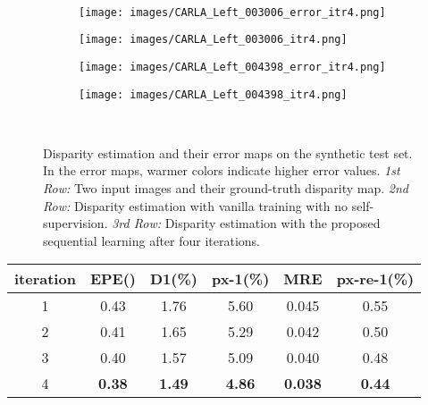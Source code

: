 \documentclass[10pt,twocolumn,letterpaper]{article}
\begin{document}
\begin{figure}[tbp]
	\\\begin{minipage}[c]{0.985\linewidth}
		\begin{subfigure}[c]{.239\linewidth}
			\texttt{[image: images/CARLA\_Left\_003006\_error\_itr4.png]}
			\vspace*{-0.38cm}
		\end{subfigure}	
		\begin{subfigure}[c]{.239\linewidth}
			\texttt{[image: images/CARLA\_Left\_003006\_itr4.png]}
			\vspace*{-0.38cm}		
		\end{subfigure}
		\begin{subfigure}[c]{.239\linewidth}
			\texttt{[image: images/CARLA\_Left\_004398\_error\_itr4.png]}
			\vspace*{-0.38cm}
		\end{subfigure}	
		\begin{subfigure}[c]{.239\linewidth}
			\texttt{[image: images/CARLA\_Left\_004398\_itr4.png]}
			\vspace*{-0.38cm}		
		\end{subfigure}
	\end{minipage}	\\\vspace{-0.3cm}
	\caption{Disparity estimation and their error maps on the synthetic test set. In the error maps, warmer colors indicate higher error values. \emph{1st Row:} Two input images and their ground-truth disparity map. \emph{2nd Row:} Disparity estimation with vanilla training with no self-supervision. \emph{3rd Row:} Disparity estimation with the proposed sequential learning after four iterations.} 
	\label{fig:final}
\end{figure} \begin{table}[tbp]
	\begin{center}
		\footnotesize
		\begin{tabular}{@{\hskip1pt}c@{\hskip1pt}|@{\hskip1pt}c@{\hskip1pt}|@{\hskip1pt}c@{\hskip1pt}|@{\hskip1pt}c@{\hskip1pt}|@{\hskip1pt}c@{\hskip1pt}|@{\hskip1pt}c@{\hskip1pt}}
			\hline				
			iteration &    \hspace{0.1cm}EPE() & \hspace{0.1cm}D1(\%) &\hspace{0.1cm}px-1(\%) &  \hspace{0.1cm}MRE & \hspace{0.1cm}px-re-1(\%) \\ \hline
			1 &   0.43  &  1.76  &    5.60   &   0.045   &  0.55  \\
			2 &   0.41  &  1.65  &    5.29   &   0.042   &  0.50  \\ 
			3 &   0.40  &  1.57  &    5.09   &   0.040   &  0.48       \\
			4 &   \textbf{0.38}     &   \textbf{1.49}      &  \textbf{4.86}   &  \textbf{0.038}    &  \textbf{0.44}       \\ \hline
			

\end{tabular}
\end{center}
\end{table}
\end{document}
